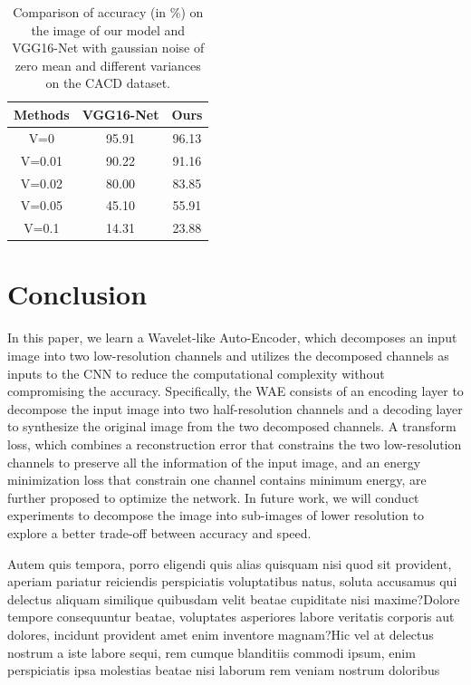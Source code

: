 \documentclass[letterpaper]{article} %
\begin{document}
\begin{table}[htbp]
\centering
\begin{tabular}{c|c|c}
\hline
Methods & VGG16-Net & Ours \\
\hline
V=0   & 95.91 & 96.13    \\
V=0.01   & 90.22  &  91.16     \\
V=0.02   & 80.00  &  83.85     \\
V=0.05   & 45.10  &  55.91     \\
V=0.1   & 14.31  &   23.88    \\
\hline
\end{tabular}
\caption{Comparison of accuracy (in \%) on the image of our model and VGG16-Net with gaussian noise of zero mean and different variances on the CACD dataset.}
\label{table:cacd_noise}
\end{table}


\section{Conclusion}
In this paper, we learn a Wavelet-like Auto-Encoder, which decomposes an input image into two low-resolution channels and utilizes the decomposed channels as inputs to the CNN to reduce the computational complexity without compromising the accuracy. Specifically, the WAE consists of an encoding layer to decompose the input image into two half-resolution channels and a decoding layer to synthesize the original image from the two decomposed channels. A transform loss, which combines a reconstruction error that constrains the two low-resolution channels to preserve all the information of the input image, and an energy minimization loss that constrain one channel contains minimum energy, are further proposed to optimize the network.
In future work, we will conduct experiments to decompose the image into sub-images of lower resolution to explore a better trade-off between accuracy and speed.


Autem quis tempora, porro eligendi quis alias quisquam nisi quod sit provident, aperiam pariatur reiciendis perspiciatis voluptatibus natus, soluta accusamus qui delectus aliquam similique quibusdam velit beatae cupiditate nisi maxime?Dolore tempore consequuntur beatae, voluptates asperiores labore veritatis corporis aut dolores, incidunt provident amet enim inventore magnam?Hic vel at delectus nostrum a iste labore sequi, rem cumque blanditiis commodi ipsum, enim perspiciatis ipsa molestias beatae nisi laborum rem veniam nostrum doloribus

\end{document}
